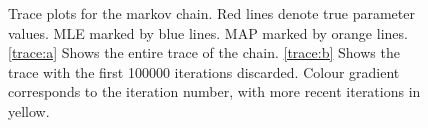 \documentclass{ieeeaccess}
\theoremstyle{definition}
\begin{document}
\begin{figure}[H]
  \centering
  \centering
  \centering
  \caption{Trace plots for the markov chain. Red lines denote true parameter values. MLE marked by blue lines. MAP marked by orange lines. \ref{trace:a} Shows the entire trace of the chain. \ref{trace:b} Shows the trace with the first 100000 iterations discarded. Colour gradient corresponds to the iteration number, with more recent iterations in yellow.}
  \label{fig:trace}
\end{figure}
\end{document}
